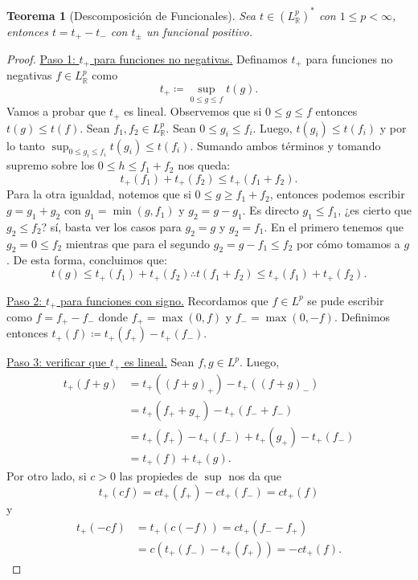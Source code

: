 \documentclass{article}
\newtheorem{Teorema}{Teorema}
\theoremstyle{plain}
\theoremstyle{definition}
\newcommand{\1}[1]{\mathbbm{1}\left( #1 \right)}
\newcommand{\R}{\mathbb{R}}
\begin{document}
\begin{Teorema}[Descomposición de Funcionales]
  Sea \(t\in (L^{p}_{\R})^{\ast}\) con \(1\le p< \infty\), entonces 
  \(t = t_{+} - t_{-}\) con \(t_{\pm}\) un funcional positivo.  
\end{Teorema}
\begin{proof}
  \underline{Paso 1: \(t_+\) para funciones no negativas.}
  Definamos \(t_{+}\) para funciones no negativas \(f\in L^{p}_{\R}\) como
  \begin{displaymath}
    t_{+} \coloneqq \sup_{0 \le g \le f} t(g).
  \end{displaymath}
  Vamos a probar que \(t_{+}\) es lineal. Observemos que
  si \(0\le g \le f\) entonces \(t(g) \le t(f)\). Sean \(f_1,f_2 \in L^{p}_{\R}\). Sean 
  \(0 \le g_i \le f_i\). Luego, \(t(g_i) \le t(f_i)\) y por lo tanto
  \(\sup_{0\le g_i \le f_i} t(g_i) \le t(f_i)\). Sumando ambos términos y tomando
  supremo sobre los \(0 \le h \le f_1 + f_2\) nos queda:
  \begin{displaymath}
    t_{+}(f_1) + t_{+}(f_2) \le t_{+}(f_1 + f_2).
  \end{displaymath}
  Para la otra igualdad, notemos que si \(0\le g \ge f_1 + f_2\), entonces podemos
  escribir \(g = g_1 + g_2\) con \(g_1 = \min(g,f_1)\) y \(g_2 = g - g_1\). 
  Es directo \(g_1 \le f_1\), ¿es cierto que \(g_2 \le f_2\)? sí, basta ver los 
  casos para \(g_2 = g\) y \(g_2 = f_1\). En el primero tenemos que \(g_2 = 0 \le f_2\)
  mientras que para el segundo \(g_2 = g - f_1 \le f_2\) por cómo tomamos a \(g\).
  De esta forma, concluimos que:
  \begin{displaymath}
    t(g) \le t_{+}(f_1) + t_{+} (f_2)
    \therefore
    t(f_1 + f_2) \le t_{+}(f_1) + t_{+}(f_2).
  \end{displaymath}

  \underline{Paso 2: \(t_+\) para funciones con signo.} Recordamos que \(f\in L^p\)
  se pude escribir como \(f = f_{+} - f_{-}\) donde \(f_{+} = \max(0,f)\) y \(f_{-} = \max(0,-f)\).   
  Definimos entonces \(t_{+}(f) \coloneqq t_{+}(f_{+}) - t_{+}(f_{-})\).

  \underline{Paso 3: verificar que \(t_+\) es lineal.}
  Sean \(f,g\in L^p\). Luego,
  \begin{align*}
    t_{+} (f+g) 
    &=
    t_+ ( (f+g)_{+} ) - t_+ ( (f+g)_{-} )
    \\&=
    t_+ ( f_+ + g_+ ) - t_+ ( f_- + f_- )
    \\&=
    t_+ ( f_+) - t_+ ( f_-) + t_+ ( g_+ ) - t_+ ( f_- )
    \\&=
    t_+ (f) + t_+ (g).
  \end{align*}
  Por otro lado, si \(c > 0\) las propiedes de \(\sup\) nos da que 
  \begin{displaymath}
    t_{+} (cf) = c t_{+} (f_{+}) - c t_{+} (f_{-})
    = c t_{+}(f)
  \end{displaymath}
  y
  \begin{align*}
    t_{+} (-cf) 
    &= t_{+} (c (-f)) = c t_{+}(f_{-} - f_{+})
    \\&= c ( t_{+}(f_{-}) - t_{+}(f_{+}) )
    = -c t_{+} (f).
  \end{align*}


\end{proof}
\end{document}

